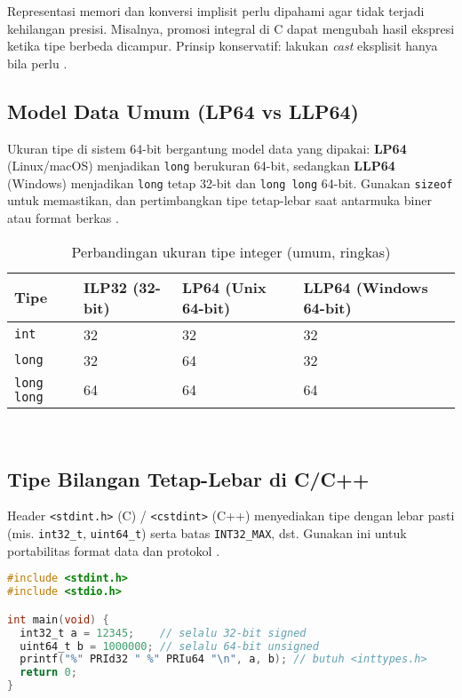 \documentclass[../main.tex]{subfiles}
\begin{document}
Representasi memori dan konversi implisit perlu dipahami agar tidak terjadi kehilangan presisi. Misalnya, promosi integral di C dapat mengubah hasil ekspresi ketika tipe berbeda dicampur. Prinsip konservatif: lakukan \emph{cast} eksplisit hanya bila perlu \parencite{gnu-c-manual,cpp-reference}.

\subsection{Model Data Umum (LP64 vs LLP64)}
Ukuran tipe di sistem 64-bit bergantung model data yang dipakai: \textbf{LP64} (Linux/macOS) menjadikan \texttt{long} berukuran 64-bit, sedangkan \textbf{LLP64} (Windows) menjadikan \texttt{long} tetap 32-bit dan \texttt{long long} 64-bit. Gunakan \texttt{sizeof} untuk memastikan, dan pertimbangkan tipe tetap-lebar saat antarmuka biner atau format berkas \parencite{wikipedia-data-models,cpp-fundamental-types}.

\begin{table}[H]
  \centering
  \caption{Perbandingan ukuran tipe integer (umum, ringkas)}
  \small
  \begin{tabular}{@{}llll@{}}
    \toprule
    Tipe & ILP32 (32-bit) & LP64 (Unix 64-bit) & LLP64 (Windows 64-bit) \\
    \midrule
    \texttt{int}       & 32 & 32 & 32 \\
    \texttt{long}      & 32 & 64 & 32 \\
    \texttt{long long} & 64 & 64 & 64 \\
    \bottomrule
  \end{tabular}
  \\\parencite{wikipedia-data-models}
\end{table}

\subsection{Tipe Bilangan Tetap-Lebar di C/C++}
Header \texttt{<stdint.h>} (C) / \texttt{<cstdint>} (C++) menyediakan tipe dengan lebar pasti (mis. \texttt{int32\_t}, \texttt{uint64\_t}) serta batas \texttt{INT32\_MAX}, dst. Gunakan ini untuk portabilitas format data dan protokol \parencite{c-std-integer-types,cpp-numeric-limits}.

\begin{lstlisting}[language=C, caption={Contoh penggunaan <stdint.h> di C}]
#include <stdint.h>
#include <stdio.h>

int main(void) {
  int32_t a = 12345;    // selalu 32-bit signed
  uint64_t b = 1000000; // selalu 64-bit unsigned
  printf("%" PRId32 " %" PRIu64 "\n", a, b); // butuh <inttypes.h>
  return 0;
}
\end{lstlisting}
\end{document}
